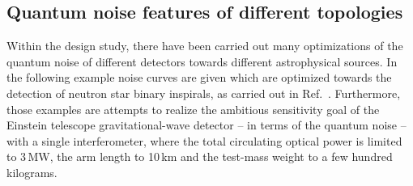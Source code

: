 \FloatBarrier
\subsection{Quantum noise features of different topologies}\label{app:QNR}

Within the design study, there
have been carried out many optimizations of the quantum noise of
different detectors towards different astrophysical sources. In
the following example noise curves are given which are optimized
towards the detection of neutron star binary inspirals, as carried
out in Ref.~\cite{Mueller-Ebhardt2009}. Furthermore, those
examples are attempts to realize the ambitious sensitivity goal of
the Einstein telescope gravitational-wave detector -- in terms of
the quantum noise -- with a single interferometer, where the total
circulating optical power is limited to 3\,MW, the arm length to
10\,km and the test-mass weight to a few hundred kilograms.

